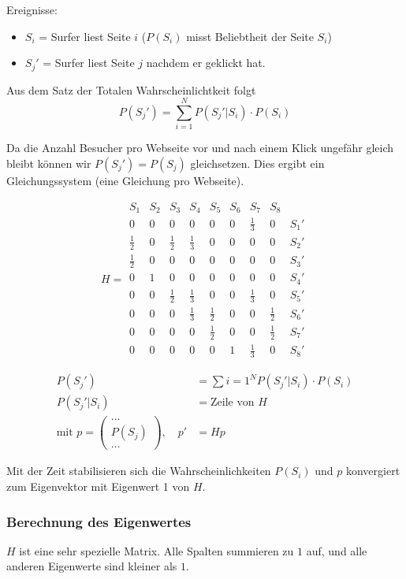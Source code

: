 \documentclass[10pt,a4paper]{scrartcl}
\begin{document}
Ereignisse:
\begin{itemize}
\item $S_{i}$ = Surfer liest Seite $i$ ($P(S_i)$ misst Beliebtheit der Seite $S_i$)
\item $S_{j}'$ = Surfer liest Seite $j$ nachdem er geklickt hat.
\end{itemize}

Aus dem Satz der Totalen Wahrscheinlichtkeit folgt
$$P(S_j') = \sum_{i=1}^N P(S_j' | S_i) \cdot P(S_i)$$

Da die Anzahl Besucher pro Webseite vor und nach einem Klick ungefähr gleich bleibt können wir $P(S_j') = P(S_j)$ gleichsetzen. Dies ergibt ein Gleichungssystem (eine Gleichung pro Webseite).

$$H = 
\begin{matrix}
  S_1 & S_2 & S_3 & S_4 & S_5 & S_6 & S_7 & S_8 &  \\
  0 & 0 & 0 & 0 & 0 & 0 & \frac{1}{3} & 0 & S_1' \\
  \frac{1}{2} & 0 & \frac{1}{2} & \frac{1}{3} & 0 & 0 & 0 & 0 & S_2' \\
  \frac{1}{2} & 0 & 0 & 0 & 0 & 0 & 0 & 0 & S_3' \\
  0 & 1 & 0 & 0 & 0 & 0 & 0 & 0 & S_4' \\
  0 & 0 & \frac{1}{2} & \frac{1}{3} & 0 & 0 & \frac{1}{3} & 0 & S_5' \\
  0 & 0 & 0 & \frac{1}{3} & \frac{1}{2} & 0 & 0 & \frac{1}{2} & S_6' \\
  0 & 0 & 0 & 0 & \frac{1}{2} & 0 & 0 & \frac{1}{2} & S_7' \\
  0 & 0 & 0 & 0 & 0 & 1 & \frac{1}{3} & 0 & S_8' 
\end{matrix}$$


\begin{align*}
P(S_{j}') &= \sum\limits{i=1}^N P(S_{j}'|S_{i}) \cdot P(S_{i}) \\
P(S_{j}'|S_{i}) &= \text{Zeile von } H \\
\text{mit } p = \begin{pmatrix}
\dots \\
P(S_{j}) \\
\dots
\end{pmatrix},\quad p' &= Hp
\end{align*}

Mit der Zeit stabilisieren sich die Wahrscheinlichkeiten $P(S_i)$ und $p$ konvergiert zum Eigenvektor mit Eigenwert 1 von $H$.

\subsubsection{Berechnung des Eigenwertes}
$H$ ist eine sehr spezielle Matrix. Alle Spalten summieren zu $1$ auf, und alle anderen Eigenwerte sind kleiner als $1$.
\end{document}
